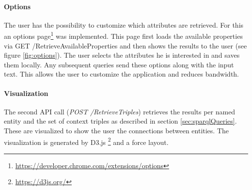 \paragraph{Options}
The user has the possibility to customize which attributes are retrieved. For this an options page\footnote{\url{https://developer.chrome.com/extensions/options}} was implemented. This page first loads the available properties via GET /RetrieveAvailableProperties and then shows the results to the user (see figure \ref{fig:options}). The user selects the attributes he is interested in and saves them locally. Any subsequent queries send these options along with the input text. This allows the user to customize the application and reduces bandwidth.

\paragraph{Visualization}
The second API call (\textit{POST /RetrieveTriples}) retrieves the results per named entity and the set of context triples as described in section \ref{sec:sparqlQueries}. These are visualized to show the user the connections between entities. The visualization is generated by D3.js \footnote{\url{https://d3js.org/}} and a force layout. 































